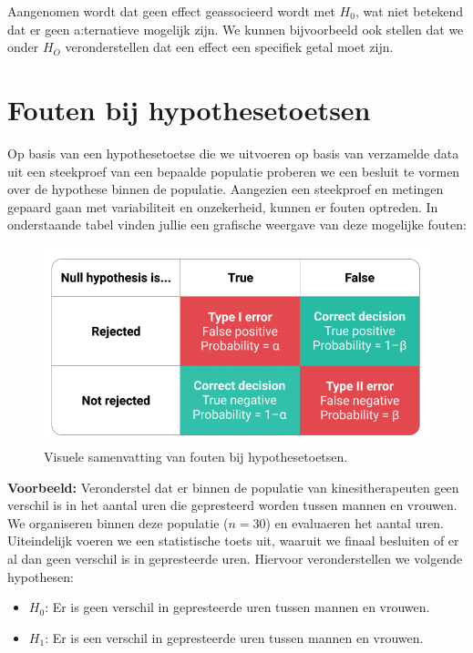 \documentclass[
]{book}
\providecommand{\tightlist}{%
  \setlength{\itemsep}{0pt}\setlength{\parskip}{0pt}}
\theoremstyle{definition}
\theoremstyle{definition}
\theoremstyle{definition}
\theoremstyle{definition}
\theoremstyle{remark}
\begin{document}
Aangenomen wordt dat geen effect geassocieerd wordt met \(H_0\), wat niet betekend dat er geen a:ternatieve mogelijk zijn. We kunnen bijvoorbeeld ook stellen dat we onder \(H_O\) veronderstellen dat een effect een specifiek getal moet zijn.

\hypertarget{fouten-bij-hypothesetoetsen}{%
\section*{Fouten bij hypothesetoetsen}\label{fouten-bij-hypothesetoetsen}}


Op basis van een hypothesetoetse die we uitvoeren op basis van verzamelde data uit een steekproef van een bepaalde populatie proberen we een besluit te vormen over de hypothese binnen de populatie. Aangezien een steekproef en metingen gepaard gaan met variabiliteit en onzekerheid, kunnen er fouten optreden. In onderstaande tabel vinden jullie een grafische weergave van deze mogelijke fouten:

\begin{figure}
\includegraphics[width=0.9\linewidth]{img/error} \caption{Visuele samenvatting van fouten bij hypothesetoetsen.}\label{fig:error}
\end{figure}

\textbf{Voorbeeld:} Veronderstel dat er binnen de populatie van kinesitherapeuten geen verschil is in het aantal uren die gepresteerd worden tussen mannen en vrouwen. We organiseren binnen deze populatie (\(n = 30\)) en evaluaeren het aantal uren. Uiteindelijk voeren we een statistische toets uit, waaruit we finaal besluiten of er al dan geen verschil is in gepresteerde uren. Hiervoor veronderstellen we volgende hypothesen:

\begin{itemize}
\tightlist
\item
  \(H_0\): Er is geen verschil in gepresteerde uren tussen mannen en vrouwen.
\item
  \(H_1\): Er is een verschil in gepresteerde uren tussen mannen en vrouwen.
\end{itemize}
\end{document}
